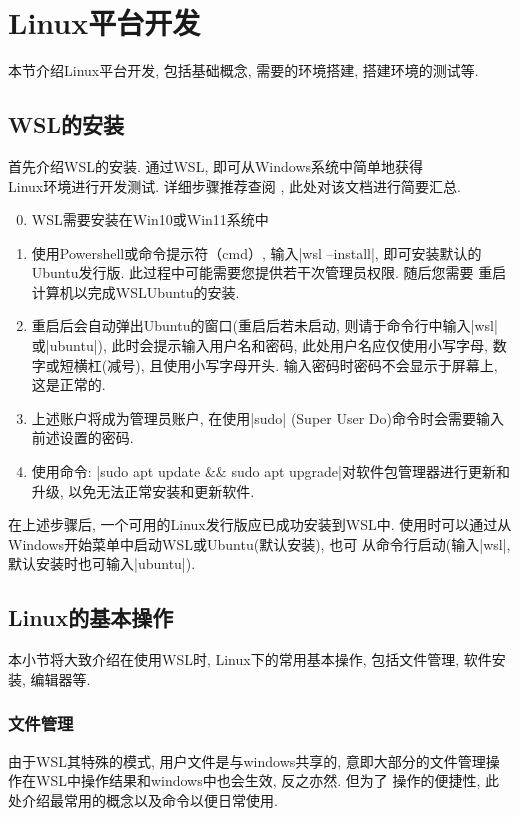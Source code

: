 \section{Linux平台开发}\label{LinuxPlatform}
本节介绍Linux平台开发, 包括基础概念, 需要的环境搭建, 搭建环境的测试等.
\subsection{WSL的安装}
首先介绍WSL的安装. 通过WSL, 即可从Windows系统中简单地获得\\Linux环境进行开发测试. 详细步骤推荐查阅
, 此处对该文档进行简要汇总.

\begin{enumerate}
      \setcounter{enumi}{-1}
      \item WSL需要安装在Win10或Win11系统中
      \item 使用Powershell或命令提示符（cmd）, 输入\cverb|wsl --install|, 即可安装默认的Ubuntu发行版. 此过程中可能需要您提供若干次管理员权限. 随后您需要
      重启计算机以完成WSL\-Ubuntu的安装.
      \item 重启后会自动弹出Ubuntu的窗口(重启后若未启动, 则请于命令行中输入\cverb|wsl|或\cverb|ubuntu|), 此时会提示输入用户名和密码, 此处用户名应仅使用小写字母,
            数字或短横杠(减号), 且使用小写字母开头. 输入密码时密码不会显示于屏幕上, 这是正常的.
      \item 上述账户将成为管理员账户, 在使用\cverb|sudo| (Super User Do)命令时会需要输入前述设置的密码.
      \item 使用命令: \cverb|sudo apt update && sudo apt upgrade|对软件包管理器进行更新和升级, 以免无法正常安装和更新软件.
\end{enumerate}

在上述步骤后, 一个可用的Linux发行版应已成功安装到WSL中. 使用时可以通过从Windows开始菜单中启动WSL或Ubuntu(默认安装), 也可
从命令行启动(输入\cverb|wsl|, 默认安装时也可输入\cverb|ubuntu|).

\subsection{Linux的基本操作}
本小节将大致介绍在使用WSL时, Linux下的常用基本操作, 包括文件管理, 软件安装, 编辑器等.
\subsubsection{文件管理}
由于WSL其特殊的模式, 用户文件是与windows共享的, 意即大部分的文件管理操作在WSL中操作结果和windows中也会生效, 反之亦然. 但为了
操作的便捷性, 此处介绍最常用的概念以及命令以便日常使用.

